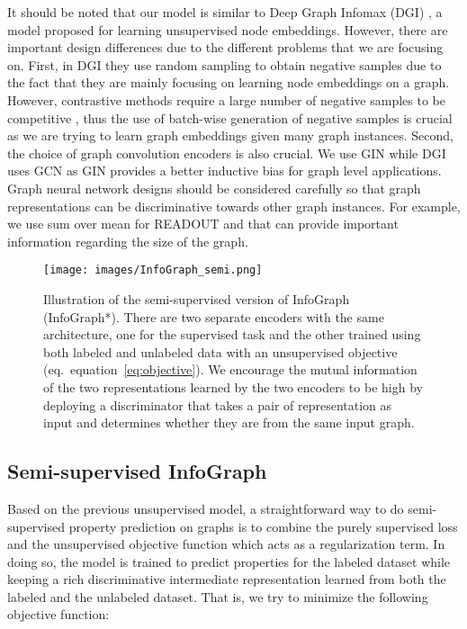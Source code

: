 \documentclass{article} \usepackage{iclr2020_conference,times}
\def\eqref#1{equation~\ref{#1}}
\def\method{InfoGraph}
\begin{document}
It should be noted that our model is similar to Deep Graph Infomax (DGI) \cite{velivckovic2018deep}, a model proposed for learning unsupervised node embeddings. 
However, there are important design differences due to the different problems that we are focusing on. First, in DGI they use random sampling to obtain negative samples due to the fact that they are mainly focusing on learning node embeddings on a graph. However, contrastive methods require a large number of negative samples to be competitive \cite{hjelm2018learning}, thus the use of batch-wise generation of negative samples is crucial as we are trying to learn graph embeddings given many graph instances. Second, the choice of graph convolution encoders is also crucial. We use GIN \cite{xu2018powerful} while DGI uses GCN \cite{kipf2016semi} as GIN provides a better inductive bias for graph level applications. Graph neural network designs should be considered carefully so that graph representations can be discriminative towards other graph instances. For example, we use sum over mean for READOUT and that can provide important information regarding the size of the graph.
\begin{figure}[t]
    \centering
    \texttt{[image: images/InfoGraph\_semi.png]}
    \caption{Illustration of the semi-supervised version of \method{} (\method{}*). There are two separate encoders with the same architecture, one for the supervised task and the other trained using both labeled and unlabeled data with an unsupervised objective (eq.~\eqref{eq:objective}). We encourage the mutual information of the two representations learned by the two encoders to be high by deploying a discriminator that takes a pair of representation as input and determines whether they are from the same input graph.}
    \label{fig:semi-gnn-infomax}
\end{figure}
\subsection{Semi-supervised \method{}}



Based on the previous unsupervised model, a straightforward way to do semi-supervised property prediction on graphs is to combine the purely supervised loss and the unsupervised objective function which acts as a regularization term. In doing so, the model is trained to predict properties for the labeled dataset while keeping a rich discriminative intermediate representation learned from both the labeled and the unlabeled dataset. That is, we try to minimize the following objective function:
\end{document}
